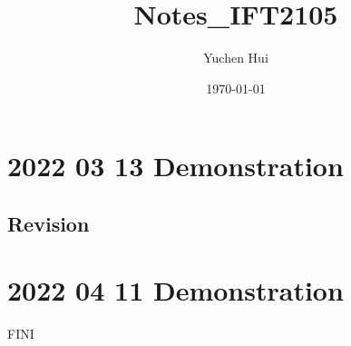 \documentclass{article}
\title{\textbf{Notes_IFT2105}}
\author{Yuchen Hui}
\date{\today}
\theoremstyle{definition}
\theoremstyle{remark}
\begin{document}
    \maketitle
    \tableofcontents
    \section{2022 03 13 Demonstration}
    \subsection{Revision}
    \section{2022 04 11 Demonstration}
    

    FINI 
\end{document}
